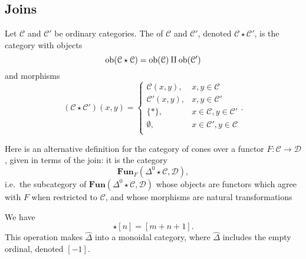 \documentclass[main.tex]{subfiles}
\begin{document}
\subsection{Joins}
\label{ssc:joins}

\begin{definition}
  \label{def:join_of_categories}
  Let $\mathcal{C}$ and $\mathcal{C}'$ be ordinary categories. The  of $\mathcal{C}$ and $\mathcal{C}'$, denoted $\mathcal{C} \star \mathcal{C}'$, is the category with objects
  \begin{equation*}
    \operatorname{\mathrm{ob}}(\mathcal{C} \star \mathcal{C}) = \operatorname{\mathrm{ob}}(\mathcal{C}) \amalg \operatorname{\mathrm{ob}}(\mathcal{C}')
  \end{equation*}
  and morphisms
  \begin{equation*}
    (\mathcal{C} \star \mathcal{C}')(x, y) =
    \begin{cases}
      \mathcal{C}(x, y), & x, y \in \mathcal{C} \\
      \mathcal{C}'(x, y), & x, y \in \mathcal{C}' \\
      \{*\}, & x \in \mathcal{C}, y \in \mathcal{C}' \\
      \emptyset, & x \in \mathcal{C}', y \in \mathcal{C} \\
    \end{cases}.
  \end{equation*}
\end{definition}

\begin{example}
  Here is an alternative definition for the category of cones over a functor $F\colon \mathcal{C} \to \mathcal{D}$, given in terms of the join: it is the category
  \begin{equation*}
    \mathbf{Fun}_{F}(\Delta^{0} \star \mathcal{C}, \mathcal{D}),
  \end{equation*}
  i.e.\ the subcategory of $\mathbf{Fun}(\Delta^{0} \star \mathcal{C}, \mathcal{D})$ whose objects are functors which agree with $F$ when restricted to $\mathcal{C}$, and whose morphisms are natural transformations
\end{example}

\begin{example}
  We have
  \begin{equation*}
    [m] \star [n] = [m + n + 1].
  \end{equation*}
  This operation makes $\hat{\Delta}$ into a monoidal category, where $\hat{\Delta}$ includes the empty ordinal, denoted $[-1]$.
\end{example}
\end{document}
